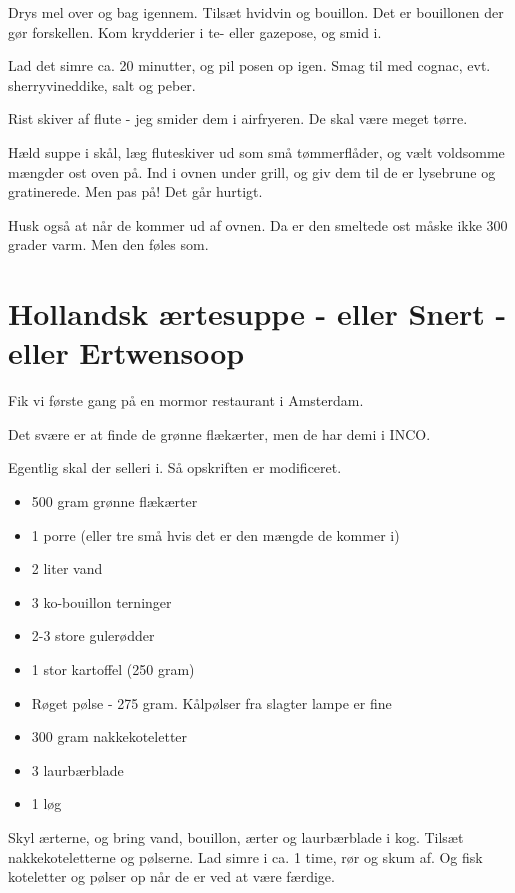 \documentclass[
  letterpaper,
  DIV=11,
  numbers=noendperiod]{scrreprt}
\providecommand{\tightlist}{%
  \setlength{\itemsep}{0pt}\setlength{\parskip}{0pt}}\usepackage{longtable,booktabs,array}
\begin{document}
Drys mel over og bag igennem. Tilsæt hvidvin og bouillon. Det er
bouillonen der gør forskellen. Kom krydderier i te- eller gazepose, og
smid i.

Lad det simre ca. 20 minutter, og pil posen op igen. Smag til med
cognac, evt. sherryvineddike, salt og peber.

Rist skiver af flute - jeg smider dem i airfryeren. De skal være meget
tørre.

Hæld suppe i skål, læg fluteskiver ud som små tømmerflåder, og vælt
voldsomme mængder ost oven på. Ind i ovnen under grill, og giv dem til
de er lysebrune og gratinerede. Men pas på! Det går hurtigt.

Husk også at når de kommer ud af ovnen. Da er den smeltede ost måske
ikke 300 grader varm. Men den føles som.

\hypertarget{hollandsk-uxe6rtesuppe---eller-snert---eller-ertwensoop}{%
\section{Hollandsk ærtesuppe - eller Snert - eller
Ertwensoop}\label{hollandsk-uxe6rtesuppe---eller-snert---eller-ertwensoop}}

Fik vi første gang på en mormor restaurant i Amsterdam.

Det svære er at finde de grønne flækærter, men de har demi i INCO.

Egentlig skal der selleri i. Så opskriften er modificeret.

\begin{itemize}
\tightlist
\item
  500 gram grønne flækærter
\item
  1 porre (eller tre små hvis det er den mængde de kommer i)
\item
  2 liter vand
\item
  3 ko-bouillon terninger
\item
  2-3 store gulerødder
\item
  1 stor kartoffel (250 gram)
\item
  Røget pølse - 275 gram. Kålpølser fra slagter lampe er fine
\item
  300 gram nakkekoteletter
\item
  3 laurbærblade
\item
  1 løg
\end{itemize}

Skyl ærterne, og bring vand, bouillon, ærter og laurbærblade i kog.
Tilsæt nakkekoteletterne og pølserne. Lad simre i ca. 1 time, rør og
skum af. Og fisk koteletter og pølser op når de er ved at være færdige.
\end{document}

